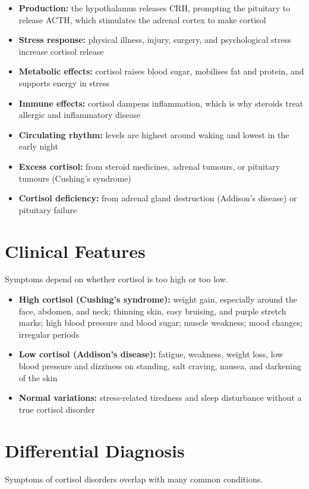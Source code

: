 \begin{itemize}
    \item \textbf{Production:} the hypothalamus releases CRH, prompting the pituitary to release ACTH, which stimulates the adrenal cortex to make cortisol
    \item \textbf{Stress response:} physical illness, injury, surgery, and psychological stress increase cortisol release
    \item \textbf{Metabolic effects:} cortisol raises blood sugar, mobilises fat and protein, and supports energy in stress
    \item \textbf{Immune effects:} cortisol dampens inflammation, which is why steroids treat allergic and inflammatory disease
    \item \textbf{Circulating rhythm:} levels are highest around waking and lowest in the early night
    \item \textbf{Excess cortisol:} from steroid medicines, adrenal tumours, or pituitary tumours (Cushing's syndrome)
    \item \textbf{Cortisol deficiency:} from adrenal gland destruction (Addison's disease) or pituitary failure
\end{itemize}

\section*{Clinical Features}
Symptoms depend on whether cortisol is too high or too low.

\begin{itemize}
    \item \textbf{High cortisol (Cushing's syndrome):} weight gain, especially around the face, abdomen, and neck; thinning skin, easy bruising, and purple stretch marks; high blood pressure and blood sugar; muscle weakness; mood changes; irregular periods
    \item \textbf{Low cortisol (Addison's disease):} fatigue, weakness, weight loss, low blood pressure and dizziness on standing, salt craving, nausea, and darkening of the skin
    \item \textbf{Normal variations:} stress-related tiredness and sleep disturbance without a true cortisol disorder
\end{itemize}

\section*{Differential Diagnosis}
Symptoms of cortisol disorders overlap with many common conditions.

